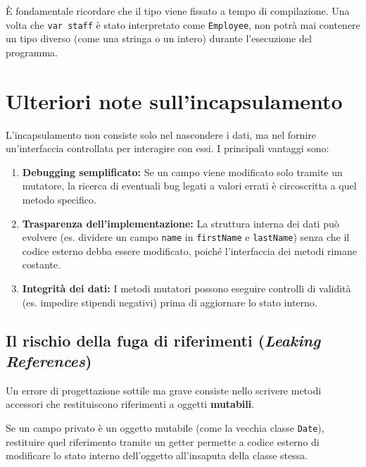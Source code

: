 \begin{warningbox}[]
    È fondamentale ricordare che il tipo viene fissato a tempo di compilazione. Una volta che \texttt{var staff} è stato interpretato come \texttt{Employee}, non potrà mai contenere un tipo diverso (come una stringa o un intero) durante l'esecuzione del programma.
\end{warningbox}

\section{Ulteriori note sull'incapsulamento}

L'incapsulamento non consiste solo nel nascondere i dati, ma nel fornire un'interfaccia controllata per interagire con essi. I principali vantaggi sono:

\begin{enumerate}
    \item \textbf{Debugging semplificato:} Se un campo viene modificato solo tramite un mutatore, la ricerca di eventuali bug legati a valori errati è circoscritta a quel metodo specifico.
    \item \textbf{Trasparenza dell'implementazione:} La struttura interna dei dati può evolvere (es. dividere un campo \texttt{name} in \texttt{firstName} e \texttt{lastName}) senza che il codice esterno debba essere modificato, poiché l'interfaccia dei metodi rimane costante.
    \item \textbf{Integrità dei dati:} I metodi mutatori possono eseguire controlli di validità (es. impedire stipendi negativi) prima di aggiornare lo stato interno.
\end{enumerate}

\subsection{Il rischio della fuga di riferimenti (\textit{Leaking References})}

Un errore di progettazione sottile ma grave consiste nello scrivere metodi accessori che restituiscono riferimenti a oggetti \textbf{mutabili}. 

\begin{warningbox}
    Se un campo privato è un oggetto mutabile (come la vecchia classe \texttt{Date}), restituire quel riferimento tramite un getter permette a codice esterno di modificare lo stato interno dell'oggetto all'insaputa della classe stessa. 
\end{warningbox}

